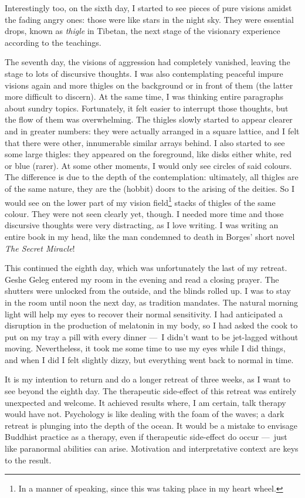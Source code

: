 \documentclass[11pt,twocolumn]{article}
\begin{document}
Interestingly too, on the sixth day, I started to see pieces of pure
visions amidst the fading angry ones: those were like stars in the
night sky. They were essential drops, known as \emph{thigle} in
Tibetan, the next stage of the visionary experience according to the
teachings.

The seventh day, the visions of aggression had completely vanished,
leaving the stage to lots of discursive thoughts. I was also
contemplating peaceful impure visions again and more thigles on the
background or in front of them (the latter more difficult to
discern). At the same time, I was thinking entire paragraphs about
sundry topics. Fortunately, it felt easier to interrupt those
thoughts, but the flow of them was overwhelming. The thigles slowly
started to appear clearer and in greater numbers: they were actually
arranged in a square lattice, and I felt that there were other,
innumerable similar arrays behind. I also started to see some large
thigles: they appeared on the foreground, like disks either white, red
or blue (rarer). At some other moments, I would only see circles of
said colours. The difference is due to the depth of the contemplation:
ultimately, all thigles are of the same nature, they are the (hobbit)
doors to the arising of the deities. So I would see on the lower part
of my vision field\footnote{In a manner of speaking, since this was
taking place in my heart wheel.} stacks of thigles of the same
colour. They were not seen clearly yet, though. I needed more time and
those discursive thoughts were very distracting, as I love writing. I
was writing an entire book in my head, like the man condemned to death
in Borges' short novel \emph{The Secret Miracle}!

This continued the eighth day, which was unfortunately the last of my
retreat. Geshe Geleg entered my room in the evening and read a closing
prayer. The shutters were unlocked from the outside, and the blinds
rolled up. I was to stay in the room until noon the next day, as
tradition mandates. The natural morning light will help my eyes to
recover their normal sensitivity. I had anticipated a disruption in
the production of melatonin in my body, so I had asked the cook to put
on my tray a pill with every dinner ---~I didn't want to be jet-lagged
without moving. Nevertheless, it took me some time to use my eyes
while I did things, and when I did I felt slightly dizzy, but
everything went back to normal in time.

It is my intention to return and do a longer retreat of three weeks,
as I want to see beyond the eighth day. The therapeutic
side\hyp{}effect of this retreat was entirely unexpected and
welcome. It achieved results where, I am certain, talk therapy would
have not. Psychology is like dealing with the foam of the waves; a
dark retreat is plunging into the depth of the ocean. It would be a
mistake to envisage Buddhist practice as a therapy, even if
therapeutic side\hyp{}effect do occur ---~just like paranormal
abilities can arise. Motivation and interpretative context are keys to
the result.
\end{document}
